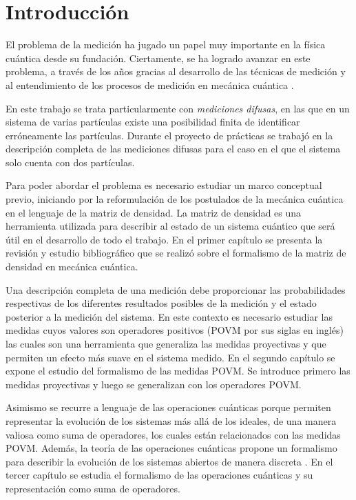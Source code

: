 \chapter*{Introducción}

El problema de la medición ha jugado un papel muy importante en la física
cuántica desde su fundación. Ciertamente, se ha logrado avanzar en este
problema, a través de los años gracias al desarrollo de las técnicas de
medición y al entendimiento de los procesos de medición en mecánica cuántica
{\cite{Pineda_2021}}. 

En este trabajo se trata particularmente con \textit{mediciones difusas}, en las
que en un sistema de varias partículas existe una posibilidad finita de
identificar erróneamente las partículas. Durante el proyecto de prácticas se
trabajó en la descripción completa de las mediciones difusas para el caso en el
que el sistema solo cuenta con dos partículas.

Para poder abordar el problema es necesario estudiar un marco conceptual previo, iniciando por la reformulación de los postulados de la mecánica cuántica en el lenguaje de la matriz de densidad. La matriz de densidad es una herramienta utilizada para describir al estado de un sistema cuántico que será útil en el desarrollo de todo el trabajo. En el primer capítulo  se presenta la revisión y estudio bibliográfico que se realizó sobre el formalismo de la matriz de densidad en mecánica cuántica. 

Una descripción completa de una medición debe proporcionar las probabilidades
respectivas de los diferentes resultados posibles de la medición y el estado
posterior a la medición del sistema. 
En este contexto es necesario estudiar las medidas cuyos valores son operadores
positivos (POVM por sus siglas en inglés) las cuales son una herramienta que
generaliza las medidas proyectivas y que permiten un efecto más suave en el
sistema medido. En el segundo capítulo se expone el estudio del formalismo de
las medidas POVM\@. Se introduce primero las medidas proyectivas y luego se
generalizan con los operadores POVM\@. 

Asimismo se recurre a lenguaje de las operaciones cuánticas porque permiten
representar la evolución de los sistemas más allá de los ideales, de una manera
valiosa como suma de operadores, los cuales están relacionados con las medidas
POVM\@. Además, la teoría de las operaciones cuánticas propone un formalismo
para describir la evolución de los sistemas abiertos de manera discreta
{\cite{nielsen_chuang_2010}}. En el tercer capítulo se estudia el formalismo de
las operaciones cuánticas y su representación como suma de operadores.


